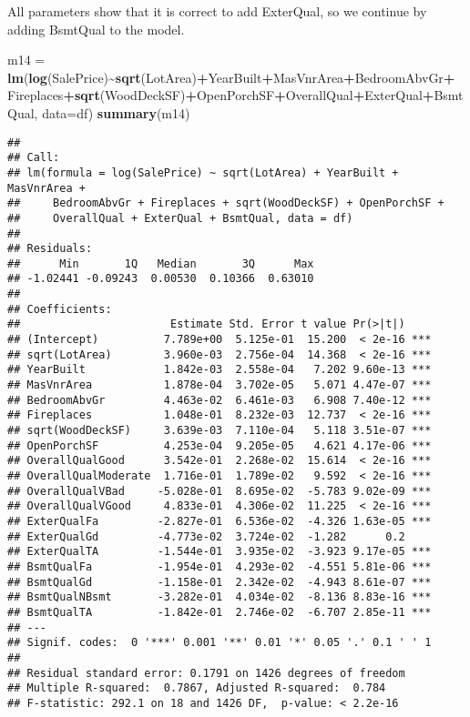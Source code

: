 \documentclass[
]{article}
\newenvironment{Shaded}{\begin{snugshade}}{\end{snugshade}}
\newcommand{\AttributeTok}[1]{\textcolor[rgb]{0.13,0.29,0.53}{#1}}
\newcommand{\FunctionTok}[1]{\textcolor[rgb]{0.13,0.29,0.53}{\textbf{#1}}}
\newcommand{\NormalTok}[1]{#1}
\newcommand{\OtherTok}[1]{\textcolor[rgb]{0.56,0.35,0.01}{#1}}
\newcommand{\SpecialCharTok}[1]{\textcolor[rgb]{0.81,0.36,0.00}{\textbf{#1}}}
\begin{document}
All parameters show that it is correct to add ExterQual, so we continue
by adding BsmtQual to the model.

\begin{Shaded}
\begin{Highlighting}[]
\NormalTok{m14 }\OtherTok{=} \FunctionTok{lm}\NormalTok{(}\FunctionTok{log}\NormalTok{(SalePrice)}\SpecialCharTok{\textasciitilde{}}\FunctionTok{sqrt}\NormalTok{(LotArea)}\SpecialCharTok{+}\NormalTok{YearBuilt}\SpecialCharTok{+}\NormalTok{MasVnrArea}\SpecialCharTok{+}\NormalTok{BedroomAbvGr}\SpecialCharTok{+}
\NormalTok{           Fireplaces}\SpecialCharTok{+}\FunctionTok{sqrt}\NormalTok{(WoodDeckSF)}\SpecialCharTok{+}\NormalTok{OpenPorchSF}\SpecialCharTok{+}\NormalTok{OverallQual}\SpecialCharTok{+}\NormalTok{ExterQual}\SpecialCharTok{+}\NormalTok{BsmtQual, }\AttributeTok{data=}\NormalTok{df)}
\FunctionTok{summary}\NormalTok{(m14)}
\end{Highlighting}
\end{Shaded}

\begin{verbatim}
## 
## Call:
## lm(formula = log(SalePrice) ~ sqrt(LotArea) + YearBuilt + MasVnrArea + 
##     BedroomAbvGr + Fireplaces + sqrt(WoodDeckSF) + OpenPorchSF + 
##     OverallQual + ExterQual + BsmtQual, data = df)
## 
## Residuals:
##      Min       1Q   Median       3Q      Max 
## -1.02441 -0.09243  0.00530  0.10366  0.63010 
## 
## Coefficients:
##                       Estimate Std. Error t value Pr(>|t|)    
## (Intercept)          7.789e+00  5.125e-01  15.200  < 2e-16 ***
## sqrt(LotArea)        3.960e-03  2.756e-04  14.368  < 2e-16 ***
## YearBuilt            1.842e-03  2.558e-04   7.202 9.60e-13 ***
## MasVnrArea           1.878e-04  3.702e-05   5.071 4.47e-07 ***
## BedroomAbvGr         4.463e-02  6.461e-03   6.908 7.40e-12 ***
## Fireplaces           1.048e-01  8.232e-03  12.737  < 2e-16 ***
## sqrt(WoodDeckSF)     3.639e-03  7.110e-04   5.118 3.51e-07 ***
## OpenPorchSF          4.253e-04  9.205e-05   4.621 4.17e-06 ***
## OverallQualGood      3.542e-01  2.268e-02  15.614  < 2e-16 ***
## OverallQualModerate  1.716e-01  1.789e-02   9.592  < 2e-16 ***
## OverallQualVBad     -5.028e-01  8.695e-02  -5.783 9.02e-09 ***
## OverallQualVGood     4.833e-01  4.306e-02  11.225  < 2e-16 ***
## ExterQualFa         -2.827e-01  6.536e-02  -4.326 1.63e-05 ***
## ExterQualGd         -4.773e-02  3.724e-02  -1.282      0.2    
## ExterQualTA         -1.544e-01  3.935e-02  -3.923 9.17e-05 ***
## BsmtQualFa          -1.954e-01  4.293e-02  -4.551 5.81e-06 ***
## BsmtQualGd          -1.158e-01  2.342e-02  -4.943 8.61e-07 ***
## BsmtQualNBsmt       -3.282e-01  4.034e-02  -8.136 8.83e-16 ***
## BsmtQualTA          -1.842e-01  2.746e-02  -6.707 2.85e-11 ***
## ---
## Signif. codes:  0 '***' 0.001 '**' 0.01 '*' 0.05 '.' 0.1 ' ' 1
## 
## Residual standard error: 0.1791 on 1426 degrees of freedom
## Multiple R-squared:  0.7867, Adjusted R-squared:  0.784 
## F-statistic: 292.1 on 18 and 1426 DF,  p-value: < 2.2e-16
\end{verbatim}
\end{document}
